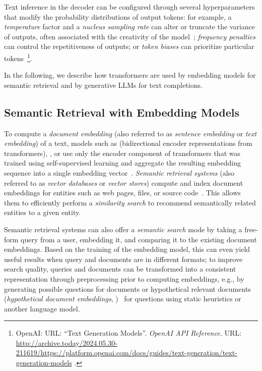 \begin{description}[noextralabelsep]
	Text inference in the decoder can be configured through several hyperparameters that modify the probability distributions of output tokens:
	for example, a \emph{temperature} factor and a \emph{nucleus sampling rate} can alter or truncate the variance of outputs, often associated with the creativity of the model~\cite{holtzman2020curious}; \emph{frequency penalties} can control the repetitiveness of outputs; or \emph{token biases} can prioritize particular tokens~\footnote{
		OpenAI: URL: ``Text Generation Models''. \emph{OpenAI API Reference.} URL:
		\url{http://archive.today/2024.05.30-211619/https://platform.openai.com/docs/guides/text-generation/text-generation-models}%
		.
	}.
\end{description}

In the following, we describe how transformers are used by embedding models for semantic retrieval and by generative LLMs for text completions.

\subsection{Semantic Retrieval with Embedding Models}
\label{sec:background/semtec/retrieval}

To compute a \emph{document embedding} (also referred to as \emph{sentence embedding} or \emph{text embedding}) of a text, models such as  (bidirectional encoder representations from transformers), , or  use only the encoder component of transformers that was trained using self-supervised learning and aggregate the resulting embedding sequence into a single embedding vector~\cite{devlin2019bert,raffel2023exploring}.
\emph{Semantic retrieval systems} (also referred to as \emph{vector databases} or \emph{vector stores}) compute and index document embeddings for entities such as web pages, files, or source code~\cite{lewis2020retrieval}.
This allows them to efficiently perform a \emph{similarity search} to recommend semantically related entities to a given entity.

Semantic retrieval systems can also offer a \emph{semantic search} mode by taking a free-form query from a user, embedding it, and comparing it to the existing document embeddings.
Based on the training of the embedding model, this can even yield useful results when query and documents are in different formats; to improve search quality, queries and documents can be transformed into a consistent representation through preprocessing prior to computing embeddings, e.g., by generating possible questions for documents or hypothetical relevant documents (\emph{hypothetical document embeddings}, )~\cite{mao2021generation,gao2022precise} for questions using static heuristics or another language model.

